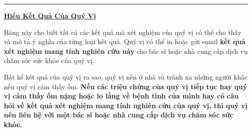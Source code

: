 \documentclass[10pt]{article}
\newcommand{\PageLine}{\rule{\textwidth}{0.25mm}}
\begin{document}
\PageLine
\bigskip

\large \underline{\textbf{Hiểu Kết Quả Của Quý Vị}}

Bảng này cho biết tất cả các kết quả mà xét nghiệm của quý vị có thể cho thấy và
mô tả ý nghĩa của từng loại kết quả. Quý vị có thể in hoặc gửi email
\textbf{kết quả xét nghiệm mang tính nghiên cứu này} cho bác sĩ hoặc nhà cung
cấp dịch vụ chăm sóc sức khỏe của quý vị.

Bất kể kết quả của quý vị ra sao, quý vị nên ở nhà và tránh xa những người khác
nếu quý vị cảm thấy ốm. \textbf{Nếu các triệu chứng của quý vị tiếp tục hay quý
vị cảm thấy ốm nặng hoặc lo lắng về bệnh tình của mình hay có câu hỏi về kết quả
xét nghiệm mang tính nghiên cứu của quý vị, thì quý vị nên liên hệ với một bác
sĩ hoặc nhà cung cấp dịch vụ chăm sóc sức khỏe.}
\end{document}
